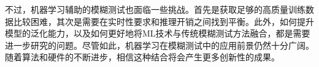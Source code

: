 \documentclass[10.5pt,compsoc]{CjC}
\theoremstyle{mystyle}
\begin{document}
不过，机器学习辅助的模糊测试也面临一些挑战。首先是获取足够的高质量训练数据比较困难，其次是需要在实时性要求和推理开销之间找到平衡。此外，如何提升模型的泛化能力，以及如何更好地将ML技术与传统模糊测试方法融合，都是需要进一步研究的问题。尽管如此，机器学习在模糊测试中的应用前景仍然十分广阔。随着算法和硬件的不断进步，相信这种结合将会产生更多创新性的成果。

\clearpage\clearpage
 










\end{document}
